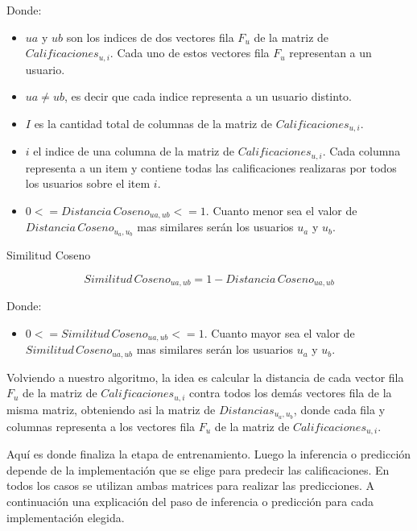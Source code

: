 \documentclass[11pt,a4paper,twoside]{thesis}
\begin{document}
\begin{description}
	\item[Donde:]
\end{description}
\begin{itemize}
	\item $ua$ y $ub$ son los indices de dos vectores fila $F_u$ de la matriz de $Calificaciones_{u,i}$. Cada uno de estos vectores fila $F_u$ representan a un usuario.
 	\item $ua \neq ub$, es decir que cada indice representa a un usuario distinto.
	\item $I$ es la cantidad total de columnas de la matriz de $Calificaciones_{u,i}$.
	\item $i$ el indice de una columna de la matriz de $Calificaciones_{u,i}$. Cada columna representa a un item y contiene todas las calificaciones realizaras por todos los usuarios sobre el item $i$.
	\item $0 <= Distancia \mspace{3mu} Coseno_{ua, ub} <= 1$. Cuanto menor sea el valor de $Distancia \mspace{3mu} Coseno_{u_a, u_b}$ mas similares serán los usuarios $u_a$ y $u_b$.
\end{itemize}

\clearpage
\begin{description}
	\item[Similitud Coseno]
\end{description}
\begin{equation}
	Similitud \mspace{3mu}Coseno_{ua, ub} = 1- Distancia \mspace{3mu}Coseno_{ua, ub}
\end{equation}
\begin{description}
	\item[Donde:]
\end{description}
\begin{itemize}
	\item $0 <= Similitud \mspace{3mu}Coseno_{ua, ub} <= 1$. Cuanto mayor sea el valor de $Similitud \mspace{3mu}Coseno_{ua, ub}$ mas similares serán los usuarios $u_a$ y $u_b$.
\end{itemize}


Volviendo a nuestro algoritmo, la idea es calcular la distancia de cada vector fila $F_u$ de la matriz de $Calificaciones_{u,i}$ contra todos los demás vectores fila de la misma matriz, obteniendo asi la matriz de $Distancias_{u_a,u_b}$, donde cada fila y columnas representa a los vectores fila $F_u$ de la matriz de $Calificaciones_{u,i}$. 

Aquí es donde finaliza la etapa de entrenamiento. Luego la inferencia o predicción depende de la implementación que se elige para predecir las calificaciones. En todos los casos se utilizan ambas matrices para realizar las predicciones. A continuación una explicación del paso de inferencia o predicción para cada implementación elegida.
\end{document}
